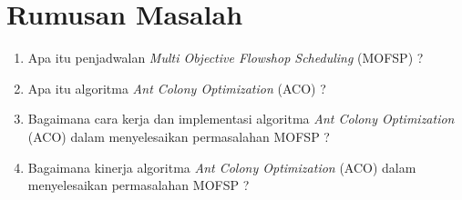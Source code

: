 \documentclass[a4paper,twoside]{article}
\begin{document}
\section{Rumusan Masalah}

\begin{enumerate}[label=(\alph*)]
	\item Apa itu penjadwalan {\it Multi Objective Flowshop Scheduling} (MOFSP) ?
	\item Apa itu algoritma {\it Ant Colony Optimization} (ACO) ?
	\item Bagaimana cara kerja dan implementasi algoritma {\it Ant Colony Optimization} (ACO) dalam menyelesaikan permasalahan MOFSP ?
	\item Bagaimana kinerja algoritma {\it Ant Colony Optimization} (ACO) dalam menyelesaikan permasalahan MOFSP ?

\end{enumerate}
\end{document}
